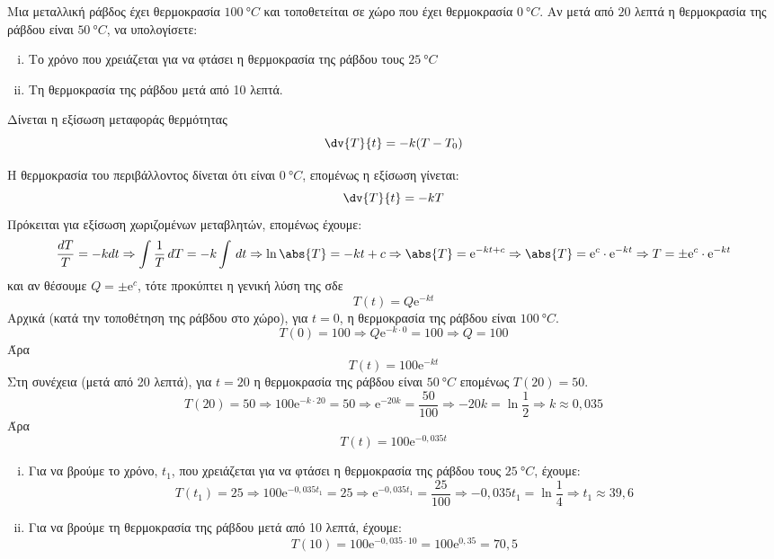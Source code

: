 \begin{problem}
  Μια μεταλλική ράβδος έχει θερμοκρασία $ \SI{100}{\degree C} $ και τοποθετείται 
  σε χώρο που έχει θερμοκρασία $ \SI{0}{\degree C} $. Αν μετά από $ 20 $ λεπτά η 
  θερμοκρασία της ράβδου είναι $ \SI{50}{\degree C} $, να υπολογίσετε:
  \begin{enumerate}[i)]
    \item Το χρόνο που χρειάζεται για να φτάσει η θερμοκρασία της ράβδου τους 
      $ \SI{25}{\degree C} $ 
    \item Τη θερμοκρασία της ράβδου μετά από 10 λεπτά.
  \end{enumerate}
  Δίνεται η εξίσωση μεταφοράς θερμότητας 
  \[
    \dv{T}{t} = -k (T-T_{0}) 
  \]
\end{problem}
\begin{solution}
  Η θερμοκρασία του περιβάλλοντος δίνεται ότι είναι $ \SI{0}{\degree C} $, επομένως 
  η εξίσωση γίνεται: 
  \[
    \dv{T}{t} = -kT 
  \]
  Πρόκειται για εξίσωση χωριζομένων μεταβλητών, επομένως έχουμε:
  \[
    \frac{d T}{T} = - k dt \Rightarrow \int \frac{1}{T} \,{d T} 
    = -k \int  \,{dt} \Rightarrow \ln{\abs{T}} = - kt + c \Rightarrow \abs{T} =
    \mathrm{e}^{-kt+c} \Rightarrow \abs{T} = \mathrm{e}^{c} \cdot \mathrm{e}^{-kt}
    \Rightarrow T = \pm \mathrm{e}^{c} \cdot \mathrm{e}^{-kt} 
  \] 
  και αν θέσουμε $ Q = \pm \mathrm{e}^{c} $, τότε προκύπτει η γενική λύση της σδε
  \[
    T(t) = Q \mathrm{e}^{-kt} 
  \]
  Αρχικά (κατά την τοποθέτηση της ράβδου στο χώρο), για $ t=0 $, η θερμοκρασία 
  της ράβδου είναι $ \SI{100}{\degree C} $. 
  \[
    T(0) = 100 \Rightarrow Q \mathrm{e}^{-k\cdot 0} = 100 \Rightarrow Q = 100
  \] 
  Άρα 
  \[
    T(t) = 100 \mathrm{e}^{-kt} 
  \] 
  Στη συνέχεια (μετά από 20 λεπτά), για $ t=20 $ η θερμοκρασία της ράβδου είναι 
  $ \SI{50}{\degree C} $ επομένως $ T(20) = 50 $.
  \[
    T(20) = 50 \Rightarrow 100 \mathrm{e}^{-k\cdot 20} = 50 \Rightarrow
    \mathrm{e}^{-20k} = \frac{50}{100} \Rightarrow -20k = \ln{\frac{1}{2}} \Rightarrow 
    k \approx 0,035
  \] 
  Άρα 
  \[
    T(t) = 100 \mathrm{e}^{-0,035 t} 
  \] 
  \begin{enumerate}[i)]
    \item Για να βρούμε το χρόνο, $t_{1}$,  που χρειάζεται για να φτάσει η 
      θερμοκρασία της ράβδου τους $ \SI{25}{\degree C} $, έχουμε:
      \[
        T(t_{1}) = 25 \Rightarrow 100 \mathrm{e}^{-0,035 t_{1}} = 25 \Rightarrow 
        \mathrm{e}^{-0,035 t_{1}} = \frac{25}{100} \Rightarrow -0,035 t_{1} =
        \ln{\frac{1}{4}} \Rightarrow t_{1} \approx 39,6 
      \]
    \item Για να βρούμε τη θερμοκρασία της ράβδου μετά από 10 λεπτά, έχουμε:
      \[
        T(10) = 100 \mathrm{e}^{-0,035 \cdot 10} = 100 \mathrm{e}^{0,35} = 70,5 
      \]
  \end{enumerate}
\end{solution}

